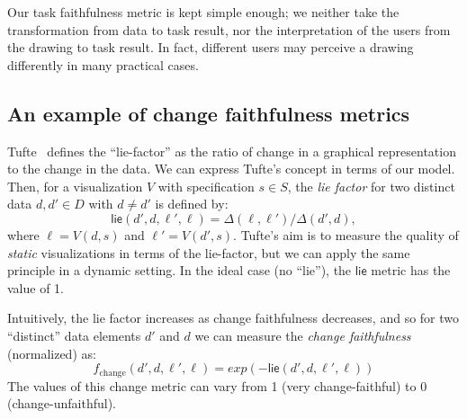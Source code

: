 \documentclass[10pt,journal,cspaper,compsoc]{IEEEtran}
\newcommand{\lie}{\textsf{lie}}
\begin{document}
Our task faithfulness metric is kept simple enough; we neither take the transformation from data to task result, nor the interpretation of the users from the drawing to task result. In fact, different users may perceive a drawing differently in many practical cases.



\subsection{An example of change faithfulness metrics}
Tufte~\cite{tuftevisual} defines the ``lie-factor'' as the ratio of change in a
graphical representation to the change in the data. We can express Tufte's concept in terms of our model. Then, for a visualization $V$ with specification $s \in S$, the \emph{lie factor} for two distinct data $d, d' \in D$ with $d \neq d'$ is defined by:
\begin{equation*}
\lie(d', d, \ell', \ell) = \Delta(\ell,\ell')/ \Delta(d',d),
\end{equation*}
where $\ell=V(d,s)$ and  $\ell'=V(d',s)$.
Tufte's aim is to measure the quality of \emph{static} visualizations in terms of the lie-factor, but we can apply the same principle in a dynamic setting. In the ideal case (no ``lie''), the $\lie$ metric has the value of 1.

Intuitively, the lie factor increases as change faithfulness decreases, and so for two ``distinct'' data elements $d'$ and $d$ we can measure the \emph{change faithfulness} (normalized) as:
\begin{equation}
 f_\text{change}(d', d, \ell', \ell)= exp(-\lie (d',d,\ell',\ell))
\end{equation}
The values of this change metric can vary from 1 (very change-faithful) to 0 (change-unfaithful).



\begin{comment}
We define metrics of change faithfulness for arbitrary graph visualizations.

On the other hand, our other model - the task-change faithfulness can be defined as:
$$ f_{taskchange}(d)= \lie (d, T_L(V(d,s,t)) ),$$
where $ T_L(V(d,s))$ is task result from a picture of the data.
\end{comment}
\end{document}
